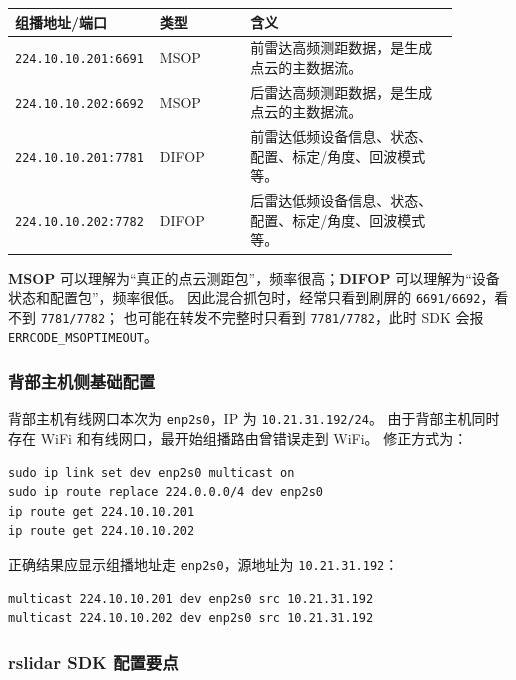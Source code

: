 \documentclass[UTF8,11pt,a4paper]{ctexart}
\begin{document}
\begin{center}
\renewcommand{\arraystretch}{1.25}
\begin{tabular}{p{0.22\linewidth}p{0.20\linewidth}p{0.46\linewidth}}
\toprule
\textbf{组播地址/端口} & \textbf{类型} & \textbf{含义}\\
\midrule
\texttt{224.10.10.201:6691} & MSOP & 前雷达高频测距数据，是生成点云的主数据流。\\
\texttt{224.10.10.202:6692} & MSOP & 后雷达高频测距数据，是生成点云的主数据流。\\
\texttt{224.10.10.201:7781} & DIFOP & 前雷达低频设备信息、状态、配置、标定/角度、回波模式等。\\
\texttt{224.10.10.202:7782} & DIFOP & 后雷达低频设备信息、状态、配置、标定/角度、回波模式等。\\
\bottomrule
\end{tabular}
\end{center}

\textbf{MSOP} 可以理解为“真正的点云测距包”，频率很高；\textbf{DIFOP} 可以理解为“设备状态和配置包”，频率很低。
因此混合抓包时，经常只看到刷屏的 \texttt{6691/6692}，看不到 \texttt{7781/7782}；
也可能在转发不完整时只看到 \texttt{7781/7782}，此时 SDK 会报 \texttt{ERRCODE\_MSOPTIMEOUT}。

\subsubsection{背部主机侧基础配置}

背部主机有线网口本次为 \texttt{enp2s0}，IP 为 \texttt{10.21.31.192/24}。
由于背部主机同时存在 WiFi 和有线网口，最开始组播路由曾错误走到 WiFi。
修正方式为：

\begin{verbatim}
sudo ip link set dev enp2s0 multicast on
sudo ip route replace 224.0.0.0/4 dev enp2s0
ip route get 224.10.10.201
ip route get 224.10.10.202
\end{verbatim}

正确结果应显示组播地址走 \texttt{enp2s0}，源地址为 \texttt{10.21.31.192}：

\begin{verbatim}
multicast 224.10.10.201 dev enp2s0 src 10.21.31.192
multicast 224.10.10.202 dev enp2s0 src 10.21.31.192
\end{verbatim}

\subsubsection{rslidar SDK 配置要点}
\end{document}

